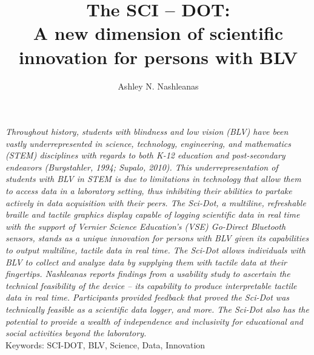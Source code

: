 \documentclass[11.5pt]{sig-alternate}
\makeatletter
\let\oldabstract\abstract
\let\oldendabstract\endabstract
\renewenvironment{abstract}
{\renewenvironment{quotation}%
               {\list{}{\addtolength{\leftmargin}{1em} %
                        \listparindent 1.5em%
                        \itemindent    \listparindent%
                        \rightmargin   \leftmargin%
                        \parsep        \z@ \@plus\p@}%
                \item\relax}%
               {\endlist}%
\oldabstract}
{\oldendabstract}
\makeatother
\begin{document}
\title{The SCI – DOT: \\
A new dimension of scientific innovation for persons with BLV}

\author[1]{\large \color{blue} Ashley N. Nashleanas}



\toappear{}

\maketitle
\begin{@twocolumnfalse} 
\begin{abstract}
\item 
\begin{large}
 \textit{Throughout history, students with blindness and low vision (BLV) have been vastly underrepresented in science, technology, engineering, and mathematics (STEM) disciplines with regards to both K-12 education and post-secondary endeavors (Burgstahler, 1994; Supalo, 2010). This underrepresentation of students with BLV in STEM is due to limitations in technology that allow them to access data in a laboratory setting, thus inhibiting their abilities to partake actively in data acquisition with their peers. The Sci-Dot, a multiline, refreshable braille and tactile graphics display capable of logging scientific data in real time with the support of Vernier Science Education’s (VSE) Go-Direct Bluetooth sensors, stands as a unique innovation for persons with BLV given its capabilities to output multiline, tactile data in real time. The Sci-Dot allows individuals with BLV to collect and analyze data by supplying them with tactile data at their fingertips. Nashleanas reports findings from a usability study to ascertain the technical feasibility of the device – its capability to produce interpretable tactile data in real time. Participants provided feedback that proved the Sci-Dot was technically feasible as a scientific data logger, and more. The Sci-Dot also has the potential to provide a wealth of independence and inclusivity for educational and social activities beyond the laboratory.}\\
 

   
     
     Keywords: SCI-DOT, BLV, Science, Data, Innovation 
 \end{large}     
\end{abstract}
\end{@twocolumnfalse}
\end{document}
